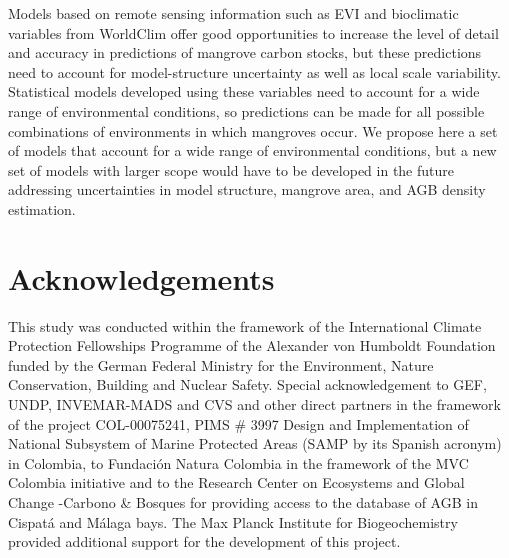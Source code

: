 \documentclass[review, authoryear]{elsarticle}   	%
\begin{document}
Models based on remote sensing information such as EVI and bioclimatic variables from WorldClim offer good opportunities to increase the level of detail and accuracy in predictions of mangrove carbon stocks, but these predictions need to account for model-structure uncertainty as well as local scale variability. Statistical models developed using these variables need to account for a wide range of environmental conditions, so predictions can be made for all possible combinations of environments in which mangroves occur. We propose here a set of models that account for a wide range of environmental conditions, but a new set of models with larger scope would have to be developed in the future addressing uncertainties in model structure, mangrove area, and AGB density estimation. 



\section*{Acknowledgements}
This study was conducted within the framework of the International Climate Protection Fellowships Programme of the Alexander von Humboldt Foundation funded by the German Federal Ministry for the Environment, Nature Conservation, Building and Nuclear Safety.
Special acknowledgement to GEF, UNDP, INVEMAR-MADS and CVS and other direct partners in the framework of the project COL-00075241, PIMS \# 3997 Design and Implementation of National Subsystem of Marine Protected Areas (SAMP by its Spanish acronym) in Colombia, to Fundaci\'on Natura Colombia in the framework of the MVC Colombia initiative and to the Research Center on Ecosystems and Global Change -Carbono \& Bosques for providing access to the database of AGB in Cispat\'a and M\'alaga bays.
The Max Planck Institute for Biogeochemistry provided additional support for the development of this project. 
\end{document}
